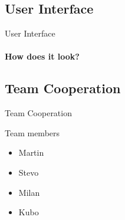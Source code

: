 \documentclass{beamer}
\begin{document}
\begin{darkframes}
    \subsection{User Interface}
    \begin{frame}{User Interface}
      \framesubtitle{How does it look?}%
    \end{frame}
	
	\subsection{Team Cooperation}
	\begin{frame}{Team Cooperation}
	
	Team members
        \begin{itemize}
          \item Martin
          \item Stevo
          \item Milan
          \item Kubo
        \end{itemize}
    

\end{frame}
\end{darkframes}
\end{document}
